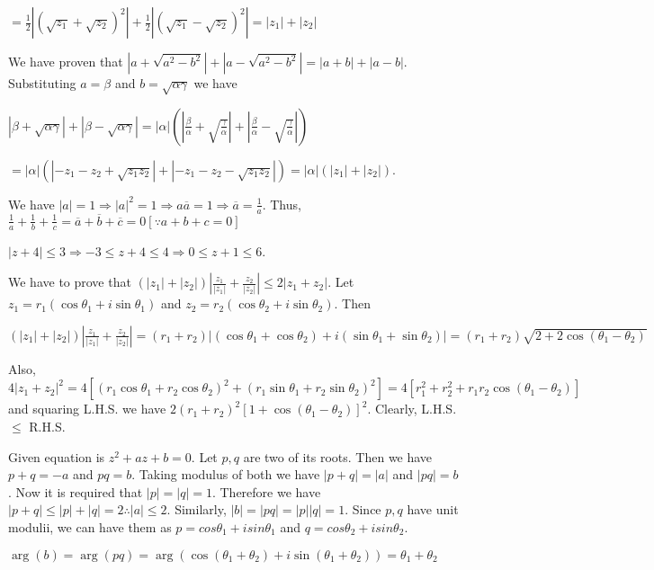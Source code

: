   $= \frac{1}{2}\left|(\sqrt{z_1} + \sqrt{z_2})^2\right| + \frac{1}{2}\left|(\sqrt{z_1} -
  \sqrt{z_2})^2\right| = |z_1| + |z_2|$
\item We have proven that $|a + \sqrt{a^2 - b^2}| + |a - \sqrt{a^2 - b^2}| = |a + b| + |a -
  b|$. Substituting $a = \beta$ and $b = \sqrt{\alpha\gamma}$ we have

  $|\beta + \sqrt{\alpha\gamma}| + |\beta - \sqrt{\alpha\gamma}| = |\alpha|\left(|\frac{\beta}{\alpha} +
  \sqrt{\frac{\gamma}{\alpha}}| +|\frac{\beta}{\alpha} - \sqrt{\frac{\gamma}{\alpha}}|\right)$

  $= |\alpha|\left(|-z_1 - z_2 + \sqrt{z_1z_2}| + |-z_1 - z_2 - \sqrt{z_1z_2}|\right) = |\alpha|(|z_1| +
  |z_2|)$.
\item We have $|a| = 1 \Rightarrow |a|^2 = 1 \Rightarrow a\overline{a} = 1 \Rightarrow \overline{a} =
  \frac{1}{a}$. Thus, $\frac{1}{a} + \frac{1}{b} + \frac{1}{c} = \overline{a} + \overline{b} +\overline{c} =
  0 [\because a + b + c = 0]$
\item $|z + 4|\leq 3 \Rightarrow -3 \leq z + 4\leq 4 \Rightarrow 0\leq z + 1\leq 6$.
\item We have to prove that $(|z_1| + |z_2|)\left|\frac{z_1}{|z_1|} + \frac{z_2}{|z_2|}\right| \leq 2|z_1 +
  z_2|$. Let $z_1 = r_1(\cos\theta_1 + i\sin\theta_1)$ and $z_2 = r_2(\cos\theta_2 + i\sin\theta_2)$. Then

  $(|z_1| + |z_2|)\left|\frac{z_1}{|z_1|} + \frac{z_2}{|z_2|}\right| = (r_1 + r_2)\left|(\cos\theta_1 +
  \cos\theta_2) + i(\sin\theta_1 + \sin\theta_2)\right| = (r_1 + r_2)\sqrt{2 + 2\cos(\theta_1 - \theta_2)}$

  Also, $4|z_1 + z_2|^2 = 4[(r_1\cos\theta_1 + r_2\cos\theta_2)^2 + (r_1\sin\theta_1 + r_2\sin\theta_2)^2] =
  4[r_1^2 + r_2^2 + r_1r_2\cos(\theta_1 - \theta_2)]$ and squaring L.H.S. we have $2(r_1 + r_2)^2[1 +
    \cos(\theta_1 - \theta_2)]^2$. Clearly, L.H.S. $\leq$ R.H.S.
\item Given equation is $z^2 + az + b = 0$. Let $p, q$ are two of its roots. Then we have $p + q = -a$ and
  $pq = b$. Taking modulus of both we have $|p + q| = |a|$ and $|pq| = b$. Now it is required that $|p| =
  |q| = 1.$ Therefore we have $|p + q| \le |p| + |q| = 2 \therefore |a| \le 2.$ Similarly, $|b| = |pq| =
  |p||q| = 1$. Since $p, q$ have unit modulii, we can have them as $p = cos\theta_1 + isin\theta_1$ and $q =
  cos\theta_2 + isin\theta_2$.

  $\arg(b) = \arg(pq) = \arg(\cos(\theta_1 + \theta_2) + i\sin(\theta_1 + \theta_2)) = \theta_1 + \theta_2$

